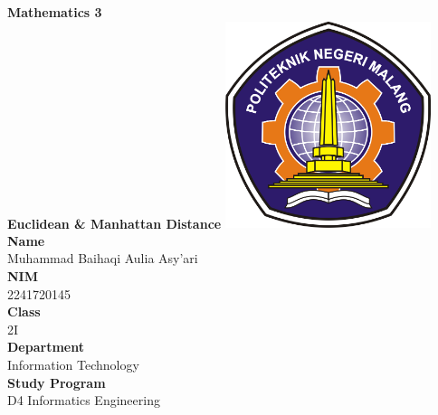 \documentclass[12pt,titlepage]{article}
\newcommand{\vSubject}{Mathematics 3}
\newcommand{\vSubtitle}{Euclidean \& Manhattan Distance}
\newcommand{\vName}{Muhammad Baihaqi Aulia Asy'ari}
\newcommand{\vNIM}{2241720145}
\newcommand{\vClass}{2I}
\newcommand{\vDepartment}{Information Technology}
\newcommand{\vStudyProgram}{D4 Informatics Engineering}
\begin{document}
\begin{titlepage}
    \centering
    \vfill
    {\bfseries\LARGE
        \vSubject\\
        \vskip0.25cm
        \vSubtitle
    }
    \vfill
    \includegraphics[width=6cm]{images/polinema-logo.png}
    \vfill
    {
        \textbf{Name}\\
        \vName\\
        \vskip0.5cm
        \textbf{NIM}\\
        \vNIM\\
        \vskip0.5cm
        \textbf{Class}\\
        \vClass\\
        \vskip0.5cm
        \textbf{Department}\\
        \vDepartment\\
        \vskip0.5cm
        \textbf{Study Program}\\
        \vStudyProgram
    }
\end{titlepage}

\newpage
\end{document}
